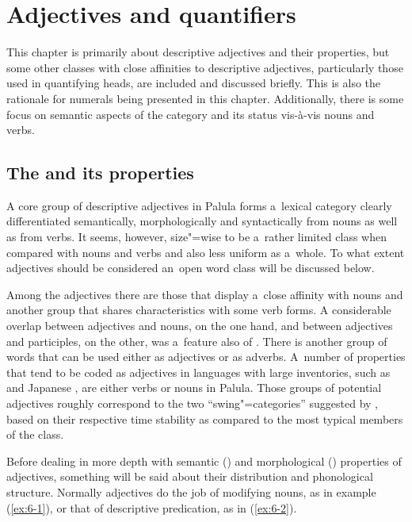 \chapter{Adjectives and quantifiers}
\label{chap:6}

This chapter is primarily about descriptive adjectives and their properties, but some other classes with close affinities to descriptive adjectives, particularly those used in quantifying  heads, are included and discussed briefly. This is also the rationale for numerals being presented in this chapter. Additionally, there is some focus on semantic aspects of the  category and its status vis-à-vis nouns and verbs.


\section{The  and its properties}
\label{sec:6-1}


A core group of descriptive adjectives in Palula forms a~lexical category clearly differentiated semantically, morphologically and syntactically from nouns as well as from verbs. It seems, however, size"=wise to be a~rather limited class when compared with nouns and verbs and also less uniform as a~whole. To what extent adjectives should be considered an~open word class will be discussed below. 



Among the adjectives there are those that display a~close affinity with nouns and another group that shares characteristics with some verb forms. A considerable overlap between adjectives and nouns, on the one hand, and between adjectives and participles, on the other, was a~feature also of \iliOIA \citep[322, 967]{whitney1960}. There is another group of words that can be used either as adjectives or as adverbs. A~number of properties that tend to be coded as adjectives in languages with large inventories, such as \iliEnglish and Japanese \citep[60]{pustet2006}, are either verbs or nouns in Palula. Those groups of potential adjectives roughly correspond to the two ``swing"=categories'' suggested by \citet[321]{givon1979}, based on their respective time stability as compared to the most typical members of the class.



Before dealing in more depth with semantic () and morphological () properties of adjectives, something will be said about their distribution and phonological structure. Normally adjectives do the job of modifying nouns, as in example (\ref{ex:6-1}), or that of descriptive predication, as in (\ref{ex:6-2}).

